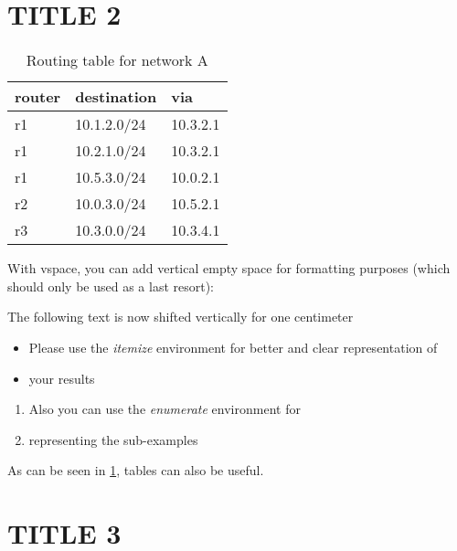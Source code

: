 \documentclass[parskip=full]{scrartcl}
\begin{document}
\section{TITLE 2}
\begin{table}[hb]
    \centering
    \caption{Routing table for network A}
    \label{tab:routing}
    \begin{tabular}{lll}
        \toprule
        \textbf{router} & \textbf{destination} & \textbf{via}  \\ \midrule
        r1 & 10.1.2.0/24 & 10.3.2.1 \\
        r1 & 10.2.1.0/24 & 10.3.2.1 \\
        r1 & 10.5.3.0/24 & 10.0.2.1 \\
        \midrule
        r2 & 10.0.3.0/24 & 10.5.2.1 \\
        \midrule
        r3 & 10.3.0.0/24 & 10.3.4.1 \\
        \bottomrule
    \end{tabular}
\end{table}
With vspace, you can add vertical empty space for formatting purposes (which should only be used as a last resort):
\vspace*{1cm}

The following text is now shifted vertically for one centimeter

\begin{itemize}
\item Please use the \textit{itemize} environment for better and clear representation of
\item your results
\end{itemize}

\begin{enumerate}
\item Also you can use the \textit{enumerate} environment for 
\item representing the sub-examples
\end{enumerate}

As can be seen in \cref{tab:routing}, tables can also be useful.
\section{TITLE 3}
\end{document}
